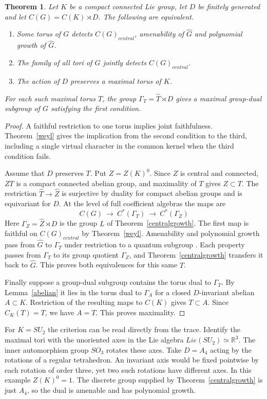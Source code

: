 \documentclass[11pt,a4paper]{article}
\newtheorem{thm}{Theorem}[section]
\theoremstyle{remark}
\begin{document}
\begin{thm}\label{joint}
Let $K$ be a compact connected Lie group, let $D$ be finitely generated
and let $C(G)=C(K)\rtimes D$. The following are equivalent.
\begin{enumerate}
\item Some torus of $G$ detects $C(G)_{central}$, amenability of $\widehat G$
and polynomial growth of $\widehat G$.
\item The family of all tori of $G$ jointly detects $C(G)_{central}$.
\item The action of $D$ preserves a maximal torus of $K$.
\end{enumerate}
For each such maximal torus $T$, the group $\Gamma_T=\widehat T\rtimes D$
gives a maximal group-dual subgroup of $G$ satisfying the first condition.
\end{thm}
\begin{proof}
A faithful restriction to one torus implies joint faithfulness.
Theorem~\ref{weyl} gives the implication from the second condition to
the third, including a single virtual character in the common kernel
when the third condition fails.

Assume that $D$ preserves $T$. Put $Z=Z(K)^0$. Since $Z$ is central and
connected, $ZT$ is a compact connected abelian group, and maximality of
$T$ gives $Z\subset T$. The restriction $\widehat T\to\widehat Z$ is
surjective by duality for compact abelian groups and is equivariant for
$D$. At the level of full coefficient algebras the maps are
\[
 C(G)\ \longrightarrow\ C^*(\Gamma_T)\
             \longrightarrow\ C^*(\Gamma_Z)
\]
Here $\Gamma_Z=\widehat Z\rtimes D$ is the group $L$ of
Theorem~\ref{centralgrowth}. The first map is faithful on $C(G)_{central}$ by
Theorem~\ref{weyl}. Amenability
and polynomial growth pass from $\widehat G$ to $\Gamma_T$ under
restriction to a quantum subgroup \cite{bp,dpr}. Each property passes
from $\Gamma_T$ to its group quotient $\Gamma_Z$, and
Theorem~\ref{centralgrowth} transfers it back to $\widehat G$. This
proves both equivalences for this same $T$.

Finally suppose a group-dual subgroup contains the torus dual to $\Gamma_T$.
By Lemma~\ref{abelian} it lies in the torus dual to $\Gamma_A$ for a closed
$D$-invariant abelian $A\subset K$. Restriction of the resulting maps
to $C(K)$ gives $T\subset A$. Since $C_K(T)=T$, we have $A=T$.
This proves maximality.
\end{proof}

For $K=SU_2$ the criterion can be read directly from the trace.
Identify the maximal tori with the unoriented axes in the Lie algebra
$Lie(SU_2)\simeq\mathbb R^3$. The inner automorphism group
$SO_3$ rotates these axes. Take $D=A_4$ acting by the rotations of a
regular tetrahedron. An invariant axis would be fixed pointwise by
each rotation of order three, yet two such rotations have different
axes. In this example $Z(K)^0=1$. The discrete group supplied by
Theorem~\ref{centralgrowth} is just $A_4$, so the dual is amenable and
has polynomial growth.
\end{document}

